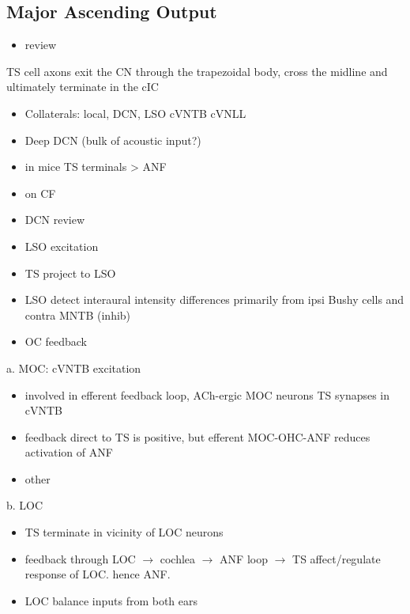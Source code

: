 \subsection{Major Ascending Output}
\label{sec-1_6}


\begin{itemize}
\item review \citep{DoucetRyugo:2006}
\end{itemize}

TS cell axons exit the CN through the trapezoidal body, cross the midline and ultimately terminate in the cIC \citep{Adams:1979}

\begin{itemize}
\item Collaterals: local, DCN, LSO cVNTB cVNLL \citep{Warr:1969,SmithJorisEtAl:1993,Thompson:1998,DoucetRyugo:2003}
\item Deep DCN (bulk of acoustic input?)
\item in mice TS terminals > ANF \citep{CaoMcGinleyEtAl:2008}
\item on CF \citep{SmithRhode:1989,FriedlandPongstapornEtAl:2003,DoucetRyugo:1997}
\item DCN review \citep{OertelYoung:2004}
\item LSO excitation
\item TS project to LSO \citep{Thompson:1998,DoucetRyugo:2003,ThompsonThompson:1991a}
\item LSO detect interaural intensity differences primarily from ipsi Bushy cells and contra MNTB (inhib)
\item OC feedback
\end{itemize}

a. MOC: cVNTB excitation

\begin{itemize}
\item involved in efferent feedback loop, ACh-ergic MOC neurons TS synapses in cVNTB \citep{WarrBeck:1996,Warr:1992,Warr:1982,VeneciaLibermanEtAl:2005,ThompsonThompson:1991,SmithJorisEtAl:1993}
\item feedback direct to TS is positive, but efferent MOC-OHC-ANF reduces activation of ANF \citep{WarrenLiberman:1989,WiederholdKiang:1970}
\item other \citep{RobertsonMulders:2000,WinterRobertsonEtAl:1989}
\end{itemize}


b. LOC

\begin{itemize}
\item TS terminate in vicinity of LOC neurons \citep{Warr:1982,ThompsonThompson:1988,ThompsonThompson:1991,DoucetRyugo:2003}
\item feedback through LOC $\rightarrow$ cochlea $\rightarrow$ ANF loop $\rightarrow$ TS affect/regulate response of LOC. hence ANF.
\item LOC balance inputs from both ears \citep{DarrowMaisonEtAl:2006}
\end{itemize}

